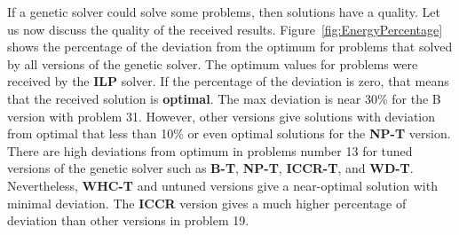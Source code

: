 \begin{table}
	\centering
	\caption{Not solved problems}\label{tab:UnsolvedProblems}
\end{table}

If a genetic solver could solve some problems, then solutions have a quality.
Let us now discuss the quality of the received results. Figure~\ref{fig:EnergyPercentage} shows the percentage of the deviation from the optimum for problems that solved by all versions of the genetic solver. The optimum values for problems were received by the \textbf{ILP} solver. If the percentage of the deviation is zero, that means that the received solution is \textbf{optimal}. The max deviation is near 30\% for the B version with problem 31. However, other versions give solutions with deviation from optimal that less than 10\% or even optimal solutions for the \textbf{NP-T} version. There are high deviations from optimum in problems number 13 for tuned versions of the genetic solver such as \textbf{B-T}, \textbf{NP-T}, \textbf{ICCR-T}, and \textbf{WD-T}. Nevertheless, \textbf{WHC-T} and untuned versions give a near-optimal solution with minimal deviation. The \textbf{ICCR} version gives a much higher percentage of deviation than other versions in problem 19.

